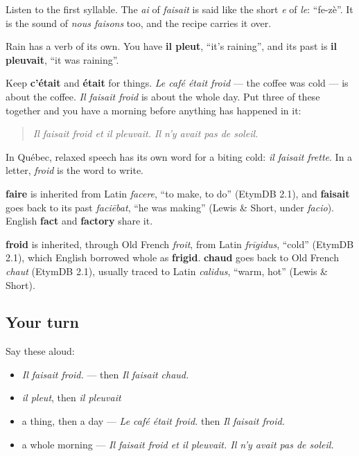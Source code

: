 Listen to the first syllable. The \emph{ai} of \emph{faisait} is said like the short \emph{e} of \emph{le}: \textquotedblleft{}fe-zè\textquotedblright{}. It is the sound of \emph{nous faisons} too, and the recipe carries it over.

Rain has a verb of its own. You have \textbf{il pleut}, \textquotedblleft{}it's raining\textquotedblright{}, and its past is \textbf{il pleuvait}, \textquotedblleft{}it was raining\textquotedblright{}.

Keep \textbf{c'était} and \textbf{était} for things. \emph{Le café était froid} — the coffee was cold — is about the coffee. \emph{Il faisait froid} is about the whole day. Put three of these together and you have a morning before anything has happened in it:

\begin{quote}
\emph{Il faisait froid et il pleuvait. Il n'y avait pas de soleil.}
\end{quote}

In Québec, relaxed speech has its own word for a biting cold: \emph{il faisait frette}. In a letter, \emph{froid} is the word to write.

\begin{cousinweb}
\textbf{faire} is inherited from Latin \emph{facere}, \textquotedblleft{}to make, to do\textquotedblright{} (EtymDB 2.1), and \textbf{faisait} goes back to its past \emph{faciēbat}, \textquotedblleft{}he was making\textquotedblright{} (Lewis \& Short, under \emph{facio}). English \textbf{fact} and \textbf{factory} share it.

\textbf{froid} is inherited, through Old French \emph{froit}, from Latin \emph{frīgidus}, \textquotedblleft{}cold\textquotedblright{} (EtymDB 2.1), which English borrowed whole as \textbf{frigid}. \textbf{chaud} goes back to Old French \emph{chaut} (EtymDB 2.1), usually traced to Latin \emph{calidus}, \textquotedblleft{}warm, hot\textquotedblright{} (Lewis \& Short).
\end{cousinweb}

\subsection*{Your turn}
Say these aloud:

\begin{itemize}
\raggedright
  \item \emph{Il faisait froid.} — then \emph{Il faisait chaud.}
  \item \emph{il pleut}, then \emph{il pleuvait}
  \item a thing, then a day — \emph{Le café était froid.} then \emph{Il faisait froid.}
  \item a whole morning — \emph{Il faisait froid et il pleuvait. Il n'y avait pas de soleil.}
\end{itemize}

